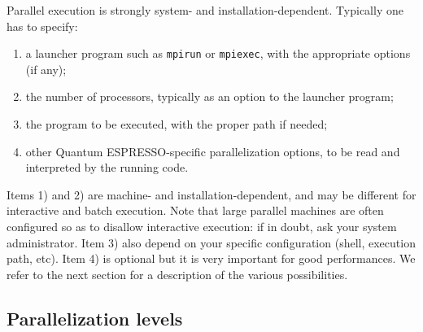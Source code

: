 \documentclass[12pt,a4paper]{article}
\def\qe{{\sc Quantum ESPRESSO}}
\begin{document}
Parallel execution is strongly system- and installation-dependent.
Typically one has to specify:
\begin{enumerate}
\item a launcher program such as \texttt{mpirun} or \texttt{mpiexec},
  with the  appropriate options (if any);
\item the number of processors, typically as an option to the launcher
  program;
\item the program to be executed, with the proper path if needed;
\item other \qe-specific parallelization options, to be
  read and interpreted by the running code.
\end{enumerate}
Items 1) and 2) are machine- and installation-dependent, and may be
different for interactive and batch execution. Note that large
parallel machines are  often configured so as to disallow interactive
execution: if in doubt, ask your system administrator.
Item 3) also depend on your specific configuration (shell, execution path, etc).
Item 4) is optional but it is very important
for good performances. We refer to the next
section for a description of the various
possibilities.

\subsection{Parallelization levels}
\end{document}
